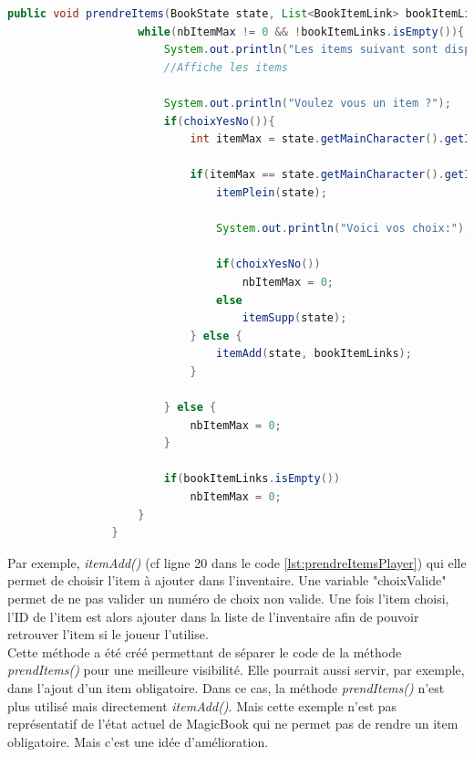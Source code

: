 			\begin{lstlisting}[gobble=16, language=java, label=lst:prendreItemsPlayer, caption=prendreItems() du Player]
				public void prendreItems(BookState state, List<BookItemLink> bookItemLinks, int nbItemMax){
					while(nbItemMax != 0 && !bookItemLinks.isEmpty()){
						System.out.println("Les items suivant sont disponible:");
						//Affiche les items

						System.out.println("Voulez vous un item ?");
						if(choixYesNo()){
							int itemMax = state.getMainCharacter().getItemsMax();

							if(itemMax == state.getMainCharacter().getItems().size()){
								itemPlein(state);

								System.out.println("Voici vos choix:");

								if(choixYesNo())
									nbItemMax = 0;
								else
									itemSupp(state);
							} else {
								itemAdd(state, bookItemLinks);
							}

						} else {
							nbItemMax = 0;
						}

						if(bookItemLinks.isEmpty())
							nbItemMax = 0;
					}
				}

			\end{lstlisting}

			Par exemple, \textit{itemAdd()} (cf ligne 20 dans le code \ref{lst:prendreItemsPlayer}) qui elle permet de choisir l'item à ajouter dans l'inventaire. Une variable "choixValide" permet de ne pas valider un numéro de choix non valide. Une fois l'item choisi, l'ID de l'item est alors ajouter dans la liste de l'inventaire afin de pouvoir retrouver l'item si le joueur l'utilise.\\
			Cette méthode a été créé permettant de séparer le code de la méthode \textit{prendItems()} pour une meilleure visibilité. Elle pourrait aussi servir, par exemple, dans l'ajout d'un item obligatoire. Dans ce cas, la méthode \textit{prendItems()} n'est plus utilisé mais directement \textit{itemAdd()}. Mais cette exemple n'est pas représentatif de l'état actuel de MagicBook qui ne permet pas de rendre un item obligatoire. Mais c'est une idée d'amélioration.\\


